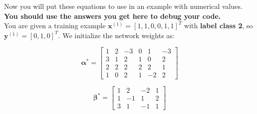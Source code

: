 \documentclass[11pt,addpoints,answers]{exam}
\newcommand{\av}{\mathbf{a}}
\newcommand{\xv}{\mathbf{x}}
\newcommand{\yv}{\mathbf{y}}
\newcommand{\alphav     }{\boldsymbol \alpha     }
\begin{document}
\begin{questions}



\clearpage    

\question Now you will put these equations to use in an example with numerical values. \textbf{You should use the answers you get here to debug your code.} \\
You are given a training example $\xv^{(1)}=[1,1,0,0,1,1]^T$ with \textbf{label class 2}, so $\yv^{(1)}=[0,1,0]^T$. We initialize the network weights as:
\begin{center}
$$\boldsymbol{\alpha^*}=
    \begin{bmatrix}
    1 & 2 & -3 & 0 & 1 & -3 \\
    3 & 1 & 2 & 1 & 0 & 2 \\
    2 & 2 & 2 & 2 & 2 & 1 \\
    1 & 0 & 2 & 1 & -2 & 2
    \end{bmatrix}$$
    
$$\boldsymbol{\beta^*}=
    \begin{bmatrix}
    1 & 2 & -2 & 1 \\
    1 & -1 & 1 & 2 \\
    3 & 1 & -1 & 1
    \end{bmatrix}
$$
\end{center}
    

\end{questions}
\end{document}
